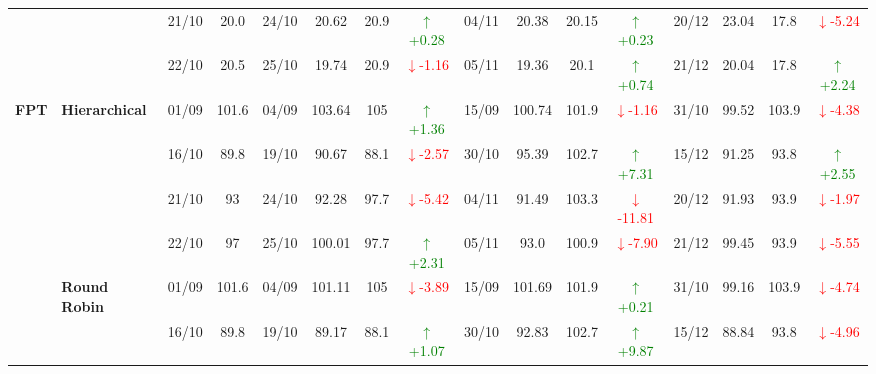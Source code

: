 {\begin{longtable}{llcc|cccc|cccc|cccc}
&
& 21/10 & 20.0 & 24/10 & 20.62 & 20.9 & \textcolor{green}{\(\uparrow\)+0.28} & 04/11 & 20.38 & 20.15 & \textcolor{green}{\(\uparrow\)+0.23} & 20/12 & 23.04 & 17.8 & \textcolor{red}{\(\downarrow\)-5.24} \\

&
& 22/10 & 20.5 & 25/10 & 19.74 & 20.9 & \textcolor{red}{\(\downarrow\)-1.16} & 05/11 & 19.36 & 20.1 & \textcolor{green}{\(\uparrow\)+0.74} & 21/12 & 20.04 & 17.8 & \textcolor{green}{\(\uparrow\)+2.24} \\
\midrule



\multirow{12}{*}{\textbf{FPT}} 
& \textbf{Hierarchical}
& 01/09 & 101.6 & 04/09 & 103.64 & 105 & \textcolor{green}{\(\uparrow\)+1.36} & 15/09 & 100.74 & 101.9 & \textcolor{red}{\(\downarrow\)-1.16} & 31/10 & 99.52 & 103.9 & \textcolor{red}{\(\downarrow\)-4.38} \\

&
& 16/10 & 89.8 & 19/10 & 90.67 & 88.1 & \textcolor{red}{\(\downarrow\)-2.57} & 30/10 & 95.39 & 102.7 & \textcolor{green}{\(\uparrow\)+7.31} & 15/12 & 91.25 & 93.8 & \textcolor{green}{\(\uparrow\)+2.55} \\

&
& 21/10 & 93 & 24/10 & 92.28 & 97.7 & \textcolor{red}{\(\downarrow\)-5.42} & 04/11 & 91.49 & 103.3 & \textcolor{red}{\(\downarrow\)-11.81} & 20/12 & 91.93 & 93.9 & \textcolor{red}{\(\downarrow\)-1.97} \\

&
& 22/10 & 97 & 25/10 & 100.01 & 97.7 & \textcolor{green}{\(\uparrow\)+2.31} & 05/11 & 93.0 & 100.9 & \textcolor{red}{\(\downarrow\)-7.90} & 21/12 & 99.45 & 93.9 & \textcolor{red}{\(\downarrow\)-5.55} \\
\cmidrule(lr){2-16}


& \textbf{Round Robin}
& 01/09 & 101.6 & 04/09 & 101.11 & 105 & \textcolor{red}{\(\downarrow\)-3.89} & 15/09 & 101.69 & 101.9 & \textcolor{green}{\(\uparrow\)+0.21} & 31/10 & 99.16 & 103.9 & \textcolor{red}{\(\downarrow\)-4.74} \\

&
& 16/10 & 89.8 & 19/10 & 89.17 & 88.1 & \textcolor{green}{\(\uparrow\)+1.07} & 30/10 & 92.83 & 102.7 & \textcolor{green}{\(\uparrow\)+9.87} & 15/12 & 88.84 & 93.8 & \textcolor{red}{\(\downarrow\)-4.96} \\


\end{longtable}}
